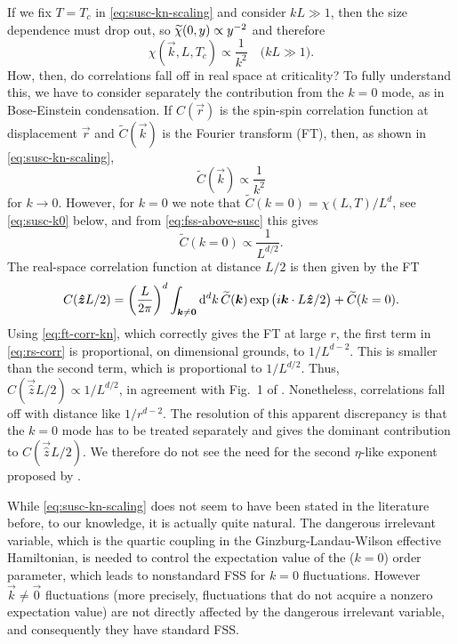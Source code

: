 If we fix $T=T_c$ in \cref{eq:susc-kn-scaling} and consider $k L \gg 1$, then
the size dependence must drop out, so $\widetilde{\chi}(0,y) \propto y^{-2}$
and therefore
\begin{equation}
  \chi(\vec{k},L,T_c) \propto \frac{1}{k^2}
  \quad\text{($k L \gg 1$)}.
  \label{eq:susc-kn-Tc-scaling}
\end{equation}
How, then, do correlations fall off in real space at criticality? To fully
understand this, we have to consider separately the contribution from the $k=0$
mode, as in Bose-Einstein condensation.
If $C(\vec{r})$ is the spin-spin correlation function at displacement $\vec{r}$
and $\widetilde{C}(\vec{k})$ is the Fourier transform (FT), then, as shown in
\cref{eq:susc-kn-scaling},
\begin{equation}
  \widetilde{C}(\vec{k}) \propto \frac{1}{k^2}
  \label{eq:ft-corr-kn}
\end{equation}
for $k \to 0$. However, for $k=0$ we note that $\widetilde{C}(k=0) =
\chi(L,T)/L^d$, see \cref{eq:susc-k0} below, and from \cref{eq:fss-above-susc}
this gives
\begin{equation}
  \widetilde{C}(k=0) \propto \frac{1}{L^{d/2}}.
\end{equation}
The real-space correlation function at distance $L/2$ is then given by the FT
\begin{equation}
  C(\bm{\hat{z}}L/2) =
  \left(\frac{L}{2\pi}\right)^d
  \int_{\bm{k}\neq\bm{0}}\mathop{}\!\mathrm{d}^d k\,
  \widetilde{C}(\bm{k})\exp\left(i\bm{k} \cdot L\bm{\hat{z}}/2\right)
  + \widetilde{C}(k=0).
  \label{eq:rs-corr}
\end{equation}
Using \cref{eq:ft-corr-kn}, which correctly gives the FT at large $r$, the
first term in \cref{eq:rs-corr} is proportional, on dimensional grounds, to
$1/L^{d-2}$. This is smaller than the second term, which is proportional to
$1/L^{d/2}$. Thus, $C(\vec{\hat{z}}L/2) \propto 1/L^{d/2}$, in agreement with
Fig.~1 of \textcite{kenna2014fisher}. Nonetheless, correlations fall off with
distance like $1/r^{d-2}$. The resolution of this apparent discrepancy is that
the $k=0$ mode has to be treated separately and gives the dominant contribution
to $C(\vec{\hat{z}}L/2)$. We therefore do not see the need for the second
$\eta$-like exponent proposed by \textcite{kenna2014fisher}.

While \cref{eq:susc-kn-scaling} does not seem to have been stated in the
literature before, to our knowledge, it is actually quite natural. The
dangerous irrelevant variable, which is the quartic coupling in the
Ginzburg-Landau-Wilson effective Hamiltonian, is needed to control the
expectation value of the ($k=0$) order parameter, which leads to nonstandard
FSS for $k=0$ fluctuations. However $\vec{k}\neq\vec{0}$ fluctuations (more
precisely, fluctuations that do not acquire a nonzero expectation value) are
not directly affected by the dangerous irrelevant variable, and consequently
they have standard FSS.

